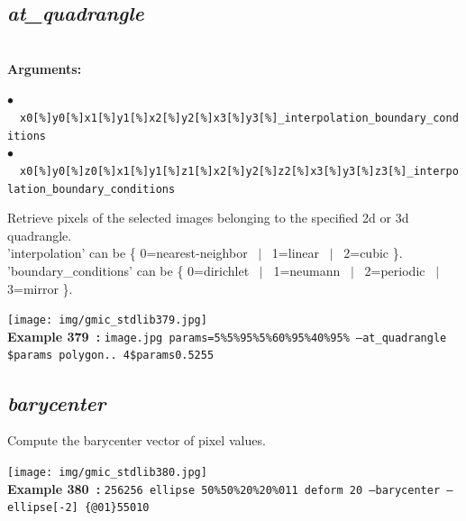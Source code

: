 \documentclass[a4paper,10.5pt,twoside]{book}
\def\comma{\discretionary{,}{}{,}}
\newcommand{\Cb}[1]{\textcolor{cb}{#1}}
\begin{document}
\subsection{\emph{at\_quadrangle} }\vspace*{-0.7em}
~\\\textbf{\Cb{Arguments: }}\begin{flushleft}
{\small \Cb{\hspace*{0.5cm}$\bullet$~~\texttt{x0[\%]{\comma}y0[\%]{\comma}x1[\%]{\comma}y1[\%]{\comma}x2[\%]{\comma}y2[\%]{\comma}x3[\%]{\comma}y3[\%]{\comma}\_interpolati\-on{\comma}\_boundary\_conditions}}}~~~\\
{\small \Cb{\hspace*{0.5cm}$\bullet$~~\texttt{x0[\%]{\comma}y0[\%]{\comma}z0[\%]{\comma}x1[\%]{\comma}y1[\%]{\comma}z1[\%]{\comma}x2[\%]{\comma}y2[\%]{\comma}z2[\%]{\comma}x3[\%]{\comma}\-y3[\%]{\comma}z3[\%]{\comma}\_interpolation{\comma}\_boundary\_conditions}}}\end{flushleft}
Retrieve pixels of the selected images belonging to the specified 2d or 3d quadrangle.
~\\'interpolation' can be \{ 0=nearest-neighbor ~$|$~ 1=linear ~$|$~ 2=cubic \}.
~\\'boundary\_conditions' can be \{ 0=dirichlet ~$|$~ 1=neumann ~$|$~ 2=periodic ~$|$~ 3=mirror \}.
\begin{center}\texttt{[image: img/gmic\_stdlib379.jpg]}\\
{\footnotesize \textbf{Example 379~:} \texttt{image.jpg params=5\%{\comma}5\%{\comma}95\%{\comma}5\%{\comma}60\%{\comma}95\%{\comma}40\%{\comma}95\% --at\_quadrangle \$params polygon.. 4{\comma}\$params{\comma}0.5{\comma}255}}
\end{center}

\subsection{\emph{barycenter} }\vspace*{-0.7em}
Compute the barycenter vector of pixel values.
\begin{center}\texttt{[image: img/gmic\_stdlib380.jpg]}\\
{\footnotesize \textbf{Example 380~:} \texttt{256{\comma}256 ellipse 50\%{\comma}50\%{\comma}20\%{\comma}20\%{\comma}0{\comma}1{\comma}1 deform 20 --barycenter --ellipse[-2] \{@0{\comma}1\}{\comma}5{\comma}5{\comma}0{\comma}10}}
\end{center}
\end{document}
